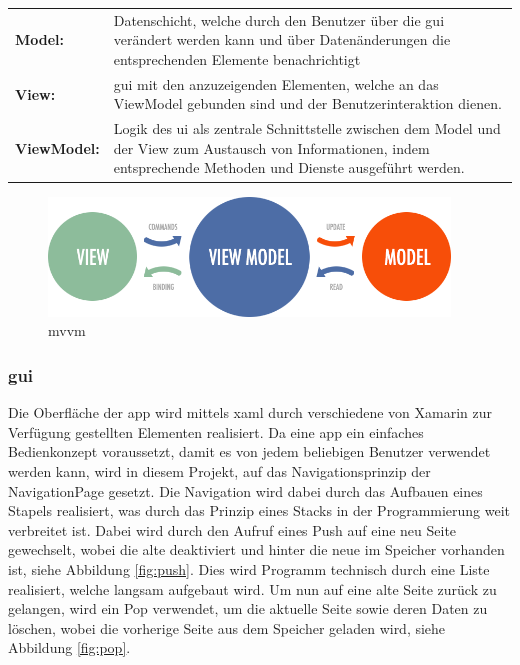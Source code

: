 \begin{tabular}{p{2.5cm} p{12.25cm}}
	\textbf{Model:} & Datenschicht, welche durch den Benutzer über die \gls{gui} verändert werden kann und über Datenänderungen die entsprechenden Elemente benachrichtigt \\
	\textbf{View:} & \gls{gui} mit den anzuzeigenden Elementen, welche an das ViewModel gebunden sind und der Benutzerinteraktion dienen. \\
	\textbf{ViewModel:} & Logik des \gls{ui} als zentrale Schnittstelle zwischen dem Model und der View zum Austausch von Informationen, indem entsprechende Methoden und Dienste ausgeführt werden. \\
\end{tabular}

\bigskip

\begin{figure}[h]
	\begin{center}
		\includegraphics[width=0.95\textwidth]{images/implementation/mvvm.png}
	\end{center}	
	\caption{\acrlong{mvvm} \cite{Brecht.MVVMEntity}}
	\label{fig:mvvm}
\end{figure}

\newpage
\subsubsection{\acrfull{gui}} %

Die Oberfläche der \gls{app} wird mittels \gls{xaml} durch verschiedene von Xamarin zur Verfügung gestellten Elementen realisiert. Da eine \gls{app} ein einfaches Bedienkonzept voraussetzt, damit es von jedem beliebigen Benutzer verwendet werden kann, wird in diesem Projekt, auf das Navigationsprinzip der NavigationPage gesetzt. Die Navigation wird dabei durch das Aufbauen eines Stapels realisiert, was durch das Prinzip eines Stacks in der Programmierung weit verbreitet ist. Dabei wird durch den Aufruf eines Push auf eine neu Seite gewechselt, wobei die alte deaktiviert und hinter die neue im Speicher vorhanden ist, siehe Abbildung \eqref{fig:push}. Dies wird Programm technisch durch eine Liste realisiert, welche langsam aufgebaut wird. Um nun auf eine alte Seite zurück zu gelangen, wird ein Pop verwendet, um die aktuelle Seite sowie deren Daten zu löschen, wobei die vorherige Seite aus dem Speicher geladen wird, siehe Abbildung \eqref{fig:pop}.\\

